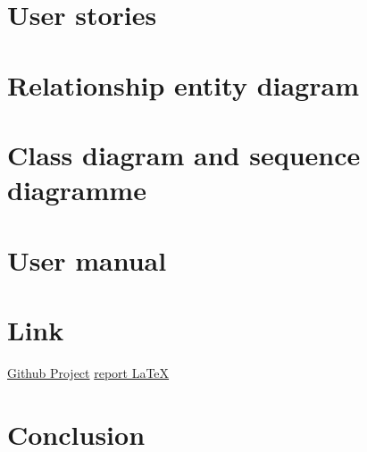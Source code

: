 \documentclass{article}
\begin{document}
\section{User stories}

\section{Relationship entity diagram}

\section{Class diagram and sequence diagramme}

\section{User manual}

\section{Link}
\href{https://github.com/I42I/Kitbox_app}{Github Project}
\href{https://github.com/PierreLouis-23317/Software2_report/settings/access}{report LaTeX}


\section{Conclusion}
\end{document}
